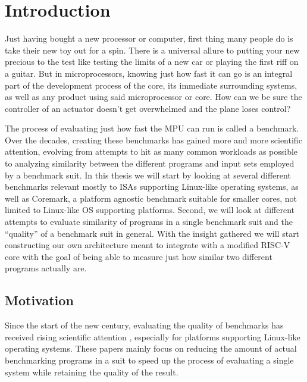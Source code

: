 \documentclass[../bachelor_paper.tex]{subfiles}
\begin{document}
\chapter{Introduction}
    \label{ch:intro}

Just having bought a new processor or computer, first thing many people do is take their new toy out for a spin. There is a universal allure to putting your new precious to the test like testing the limits of a new car or playing the first riff on a guitar. But in microprocessors, knowing just how fast it can go is an integral part of the development process of the core, its immediate surrounding systems, as well as any product using said microprocessor or core. How can we be sure the controller of an actuator doesn't get overwhelmed and the plane loses control?

The process of evaluating just how fast the \ac{MPU} can run is called a benchmark. Over the decades, creating these benchmarks has gained more and more scientific attention, evolving from attempts to hit as many common workloads as possible to analyzing similarity between the different programs and input sets employed by a benchmark suit. In this thesis we will start by looking at several different benchmarks relevant mostly to \ac{ISA}s supporting Linux-like operating systems, as well as Coremark\cite{gal-onExploringCoremarkBenchmark2012}, a platform agnostic benchmark suitable for smaller cores, not limited to Linux-like \ac{OS} supporting platforms. Second, we will look at different attempts to evaluate similarity of programs in a single benchmark suit and the ``quality'' of a benchmark suit in general. With the insight gathered we will start constructing our own architecture meant to integrate with a modified RISC-V core with the goal of being able to measure just how similar two different programs actually are.

\section{Motivation}
Since the start of the new century, evaluating the quality of benchmarks has received rising scientific attention \cite{eeckhoutDesigningComputerArchitecture2003,dujmovicEvolutionEvaluationSPEC1998,vandierendonckManyBenchmarksStress,phansalkarMeasuringProgramSimilarity2005,eeckhoutQuantifyingImpactInput}, especially for platforms supporting Linux-like operating systems. These papers mainly focus on reducing the amount of actual benchmarking programs in a suit to speed up the process of evaluating a single system while retaining the quality of the result. 
\end{document}
